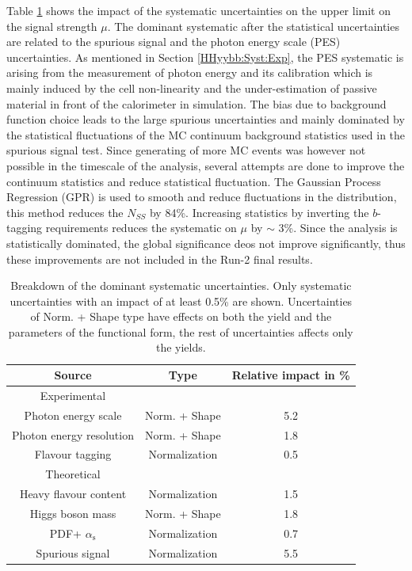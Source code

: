 Table \ref{tab:HHyybb:Results:Xsec:Sys} shows the impact of the systematic uncertainties on the upper limit on the signal strength $\mu$. The dominant systematic after the statistical uncertainties are related to the spurious signal and the photon energy scale (PES) uncertainties. As mentioned in Section \ref{HHyybb:Syst:Exp}, the PES systematic is arising from the measurement of photon energy and its calibration which is mainly induced by the cell non-linearity and the under-estimation of passive material in front of the calorimeter in simulation. The bias due to background function choice leads to the large spurious uncertainties and mainly dominated by the statistical fluctuations of the MC continuum background statistics used in the spurious signal test. Since generating of more MC events was however not possible in the timescale of the analysis, several attempts are done to improve the continuum statistics and reduce statistical fluctuation. The Gaussian Process Regression (GPR) \cite{GPR} is used to smooth and reduce fluctuations in the \myy distribution, this method reduces the $N_{SS}$ by 84\%. Increasing statistics by inverting the $b$-tagging requirements reduces the systematic on $\mu$ by $\sim$ 3\%. Since the analysis is statistically dominated, the global significance deos not improve significantly, thus these improvements are not included in the Run-2 final results.  
\begin{table}[htbp]
    \centering
    \begin{tabular}{ccc}
\hline \hline 
Source & Type & Relative impact in \%  \\
\hline Experimental & & \\
\hline Photon energy scale & Norm. + Shape & 5.2  \\
Photon energy resolution & Norm. + Shape & 1.8  \\
Flavour tagging & Normalization & 0.5  \\
\hline Theoretical & & \\
\hline Heavy flavour content & Normalization & 1.5  \\
Higgs boson mass & Norm. + Shape & 1.8  \\
PDF+ $\alpha_{\mathrm{s}}$ & Normalization & 0.7  \\
\hline Spurious signal & Normalization & 5.5 \\
\hline \hline
\end{tabular}
    \caption{Breakdown of the dominant systematic uncertainties. Only systematic uncertainties with an impact of at least 0.5\% are shown. Uncertainties of Norm. + Shape type have effects on both the yield and the parameters of the functional form, the rest of uncertainties affects only the yields.}
    \label{tab:HHyybb:Results:Xsec:Sys}
\end{table}


